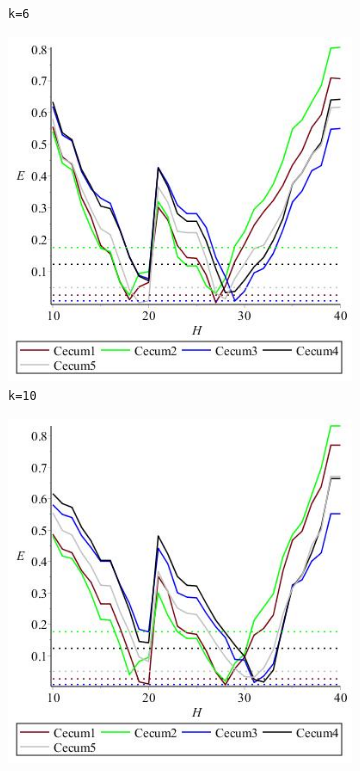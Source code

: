\documentclass[../../main.tex]{subfiles}
\begin{document}
\begin{figure}[H]
\begin{subfigure}[b]{.5\textwidth}
\caption{\texttt{k=6}}
\end{subfigure}
\begin{subfigure}[b]{.5\textwidth}
\includegraphics[width=\textwidth]{precision/minmax/k10cecum}
\caption{\texttt{k=10}}
\end{subfigure}
\begin{subfigure}[b]{.5\textwidth}
\includegraphics[width=\textwidth]{precision/minmax/k11cecum}

\end{subfigure}
\end{figure}
\end{document}
